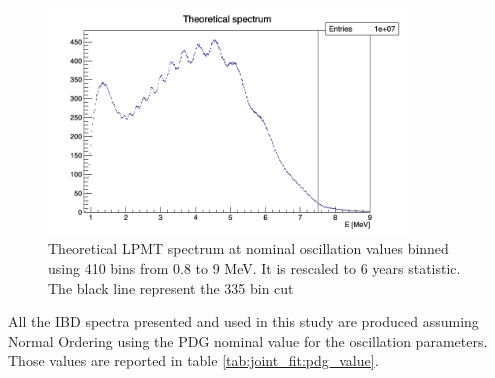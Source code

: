 \documentclass[../main.tex]{subfiles}
\begin{document}
\begin{figure}
  \centering
  \includegraphics[height=6cm]{images/joint_fit/theoretical_spectrum.png}
  \caption{Theoretical LPMT spectrum at nominal oscillation values binned using 410 bins from 0.8 to 9 MeV. It is rescaled to 6 years statistic. The black line represent the 335 bin cut}
  \label{fig:joint_fit:delta:theo}
\end{figure}

All the IBD spectra presented and used in this study are produced assuming Normal Ordering using the PDG nominal value \cite{particle_data_group_review_2020} for the oscillation parameters. Those values are reported in table \ref{tab:joint_fit:pdg_value}.

%
%
%
%
\end{document}
